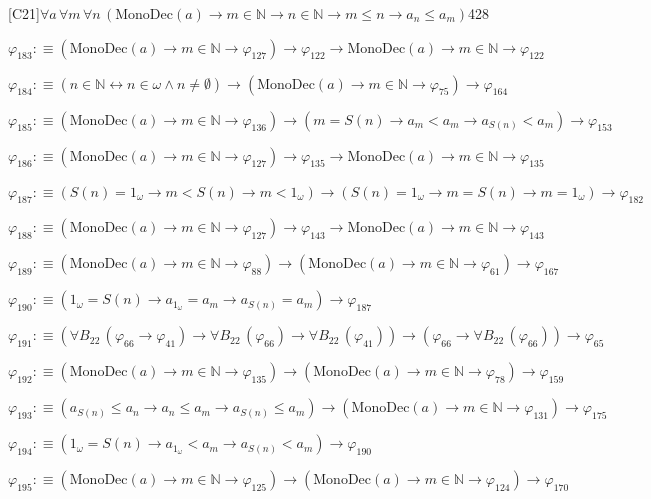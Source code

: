 \begin{fullproof}{[C21]}{$\forall a\,\forall m\,\forall n\,(\mathrm{MonoDec}(a) \to m \in \mathbb{N} \to n \in \mathbb{N} \to m \leq n \to a_{n} \leq a_{m})$}{428}
\begin{abbrevlist}
\item $\varphi_{183} :\equiv (\mathrm{MonoDec}(a) \to m \in \mathbb{N} \to \varphi_{127}) \to \varphi_{122} \to \mathrm{MonoDec}(a) \to m \in \mathbb{N} \to \varphi_{122}$
\item $\varphi_{184} :\equiv (n \in \mathbb{N} \leftrightarrow n \in \omega \land n \neq \emptyset) \to (\mathrm{MonoDec}(a) \to m \in \mathbb{N} \to \varphi_{75}) \to \varphi_{164}$
\item $\varphi_{185} :\equiv (\mathrm{MonoDec}(a) \to m \in \mathbb{N} \to \varphi_{136}) \to (m = S(n) \to a_{m} < a_{m} \to a_{S(n)} < a_{m}) \to \varphi_{153}$
\item $\varphi_{186} :\equiv (\mathrm{MonoDec}(a) \to m \in \mathbb{N} \to \varphi_{127}) \to \varphi_{135} \to \mathrm{MonoDec}(a) \to m \in \mathbb{N} \to \varphi_{135}$
\item $\varphi_{187} :\equiv (S(n) = 1_{\omega} \to m < S(n) \to m < 1_{\omega}) \to (S(n) = 1_{\omega} \to m = S(n) \to m = 1_{\omega}) \to \varphi_{182}$
\item $\varphi_{188} :\equiv (\mathrm{MonoDec}(a) \to m \in \mathbb{N} \to \varphi_{127}) \to \varphi_{143} \to \mathrm{MonoDec}(a) \to m \in \mathbb{N} \to \varphi_{143}$
\item $\varphi_{189} :\equiv (\mathrm{MonoDec}(a) \to m \in \mathbb{N} \to \varphi_{88}) \to (\mathrm{MonoDec}(a) \to m \in \mathbb{N} \to \varphi_{61}) \to \varphi_{167}$
\item $\varphi_{190} :\equiv (1_{\omega} = S(n) \to a_{1_{\omega}} = a_{m} \to a_{S(n)} = a_{m}) \to \varphi_{187}$
\item $\varphi_{191} :\equiv (\forall B_{22}\,(\varphi_{66} \to \varphi_{41}) \to \forall B_{22}\,(\varphi_{66}) \to \forall B_{22}\,(\varphi_{41})) \to (\varphi_{66} \to \forall B_{22}\,(\varphi_{66})) \to \varphi_{65}$
\item $\varphi_{192} :\equiv (\mathrm{MonoDec}(a) \to m \in \mathbb{N} \to \varphi_{135}) \to (\mathrm{MonoDec}(a) \to m \in \mathbb{N} \to \varphi_{78}) \to \varphi_{159}$
\item $\varphi_{193} :\equiv (a_{S(n)} \leq a_{n} \to a_{n} \leq a_{m} \to a_{S(n)} \leq a_{m}) \to (\mathrm{MonoDec}(a) \to m \in \mathbb{N} \to \varphi_{131}) \to \varphi_{175}$
\item $\varphi_{194} :\equiv (1_{\omega} = S(n) \to a_{1_{\omega}} < a_{m} \to a_{S(n)} < a_{m}) \to \varphi_{190}$
\item $\varphi_{195} :\equiv (\mathrm{MonoDec}(a) \to m \in \mathbb{N} \to \varphi_{125}) \to (\mathrm{MonoDec}(a) \to m \in \mathbb{N} \to \varphi_{124}) \to \varphi_{170}$

\end{abbrevlist}
\end{fullproof}
